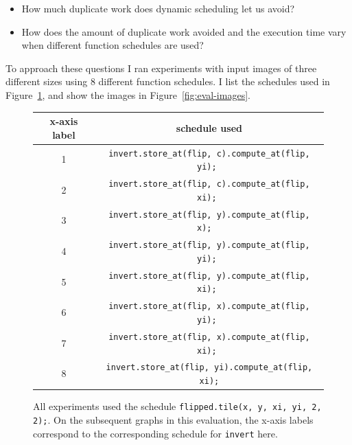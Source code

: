 \documentclass{article}
\begin{document}
\begin{itemize}
	\item How much duplicate work does dynamic scheduling let us avoid?
	\item How does the amount of duplicate work avoided and the execution time vary when different function schedules are used?
\end{itemize}

To approach these questions I ran experiments with input images of three different sizes using 8 different function schedules. I list the schedules used in Figure~\ref{fig:eval-scheds}, and show the images in Figure~\ref{fig:eval-images}.

\begin{figure}[h]
	\begin{center}
	\begin{tabular}{c|c}
		x-axis label & schedule used \\
		\hline
                1 & \texttt{invert.store\_at(flip, c).compute\_at(flip, yi);~} \\
                2 & \texttt{invert.store\_at(flip, c).compute\_at(flip, xi);~} \\
                3 & \texttt{invert.store\_at(flip, y).compute\_at(flip, x);~~} \\
                4 & \texttt{invert.store\_at(flip, y).compute\_at(flip, yi);~} \\
                5 & \texttt{invert.store\_at(flip, y).compute\_at(flip, xi);~} \\
                6 & \texttt{invert.store\_at(flip, x).compute\_at(flip, yi);~} \\
                7 & \texttt{invert.store\_at(flip, x).compute\_at(flip, xi);~} \\
                8 & \texttt{invert.store\_at(flip, yi).compute\_at(flip, xi);} 
	\end{tabular}
	\end{center}
	\caption{All experiments used the schedule \texttt{flipped.tile(x, y, xi, yi, 2, 2);}. On the subsequent graphs in this evaluation, the x-axis labels correspond to the corresponding schedule for \texttt{invert} here.}
	\label{fig:eval-scheds}
\end{figure}
\end{document}
